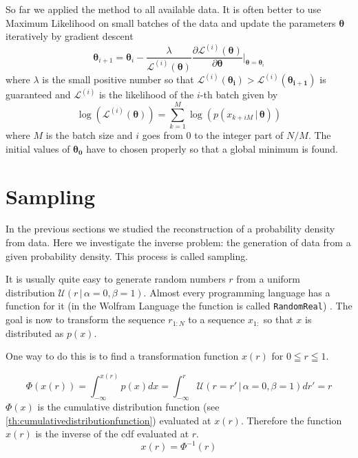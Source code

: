 \documentclass{tstextbook}
\begin{document}
\begin{remark}
So far we applied the method to all available data. It is often better to use Maximum Likelihood on small batches of the data and update the parameters $\boldsymbol{\theta}$ iteratively by gradient descent
\begin{equation}
\boldsymbol{\theta}_{i+1} = \boldsymbol{\theta}_{i} - \frac{\lambda}{\mathcal{L}^{(i)}(\boldsymbol{\theta})} \frac{\partial \mathcal{L}^{(i)}(\boldsymbol{\theta})}{\partial \boldsymbol{\theta}}\vert_{\boldsymbol{\theta}=\boldsymbol{\theta}_{i}}
\end{equation}
where $\lambda$ is the small positive number so that $\mathcal{L}^{(i)}(\boldsymbol{\theta_{i}}) > \mathcal{L}^{(i)}(\boldsymbol{\theta_{i+1}})$ is guaranteed and $\mathcal{L}^{(i)}$ is the likelihood of the $i$-th batch given by
\begin{equation}
\log\left( \mathcal{L}^{(i)}(\boldsymbol{\theta})\right) = \sum_{k=1}^M \log\left(p\left(x_{k+iM}\,\vert\, \boldsymbol{\theta}\right)\right)
\end{equation}
where $M$ is the batch size and $i$ goes from $0$ to the integer part of $N/M$. The initial values of $\boldsymbol{\theta_{0}}$ have to chosen properly so that a global minimum is found.  
\end{remark}

\section{Sampling}
In the previous sections we studied the reconstruction of a probability density from data. Here we investigate the inverse problem: the generation of data from a given probability density. This process is called sampling.

It is usually quite easy to generate random numbers $r$ from a uniform distribution $\mathcal{U}(r\,\vert\,\alpha=0,\beta=1)$. Almost every programming language has a function for it (in the Wolfram Language the function is called \texttt{RandomReal}) . The goal is now to transform the sequence $r_{1:N}$ to a sequence $x_{1:}$ so that $x$ is distributed as $p(x)$.

One way to do this is to find a transformation function $x(r)$ for $0\leqq r \leqq 1$.

\begin{equation}
  \Phi(x(r))=\int_{-\infty}^{x(r)}p(x)dx = \int_{-\infty}^{r}\mathcal{U}(r=r'\,\vert\,\alpha=0,\beta=1)dr'=r
\end{equation}
$\Phi(x)$ is the cumulative distribution function (see \ref{th:cumulativedistributionfunction}) evaluated at $x(r)$. Therefore the function $x(r)$ is the inverse of the cdf evaluated at $r$.
\begin{equation}
  x(r) = \Phi^{-1}(r)
\end{equation}
\end{document}
